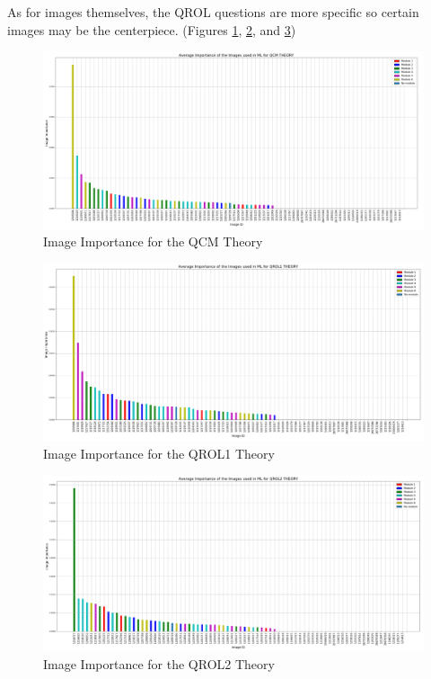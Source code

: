 \documentclass[a4paper,11pt]{report}
\numberwithin{figure}{chapter} %
\begin{document}
    As for images themselves, the QROL questions are more specific so certain images may be the centerpiece. (Figures \ref{fig:im_th1}, \ref{fig:im_th2}, and \ref{fig:im_th3})

     \begin{figure}[H]
      \centering
      \includegraphics[width=.99\linewidth]{plots/im_importance_QCM_THEORY_2018-05-02_20_53_22.png}
      \caption{Image Importance for the QCM Theory}
      \label{fig:im_th1}
      \end{figure}

      \begin{figure}[H]
      \centering
      \includegraphics[width=.99\linewidth]{plots/im_importance_QROL1_THEORY_2018-05-02_20_54_25.png}
      \caption{Image Importance for the QROL1 Theory}
      \label{fig:im_th2}
      \end{figure}

      \begin{figure}[H]
      \centering
      \includegraphics[width=.99\linewidth]{plots/im_importance_QROL2_THEORY_2018-05-02_20_53_48.png}
      \caption{Image Importance for the QROL2 Theory}
      \label{fig:im_th3}
      \end{figure}
\end{document}
